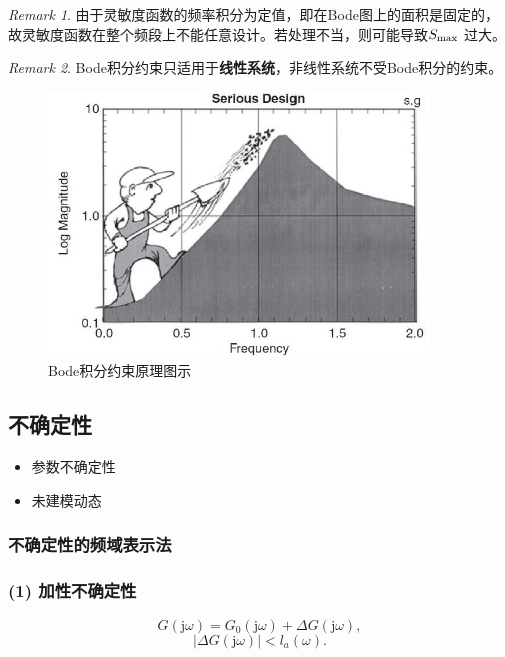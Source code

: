 \documentclass[14pt,a4paper]{article}
\theoremstyle{plain}
\theoremstyle{definition}
\theoremstyle{remark}
\newtheorem{rmk}{Remark}[section]
\theoremstyle{plain}
\theoremstyle{plain}
\theoremstyle{definition}
\begin{document}
			\begin{rmk}  
				由于灵敏度函数的频率积分为定值，即在Bode图上的面积是固定的，故灵敏度函数在整个频段上不能任意设计。若处理不当，则可能导致$S_\textnormal{max}$ 过大。
			\end{rmk} 

			\begin{rmk}  
				Bode积分约束只适用于\textbf{线性系统}，非线性系统不受Bode积分的约束。
			\end{rmk} 

			\begin{figure}[H]
				\centering
				\includegraphics[width=0.9\textwidth]{./figures/bode.jpg} 
				\caption{Bode积分约束原理图示}
				\label{fig:bode}
			\end{figure} 


		\subsection{不确定性}%
		\label{sub:不确定性}
	
			\begin{itemize}
				\item 参数不确定性
				\item 未建模动态
			\end{itemize} 

			\subsubsection{不确定性的频域表示法}%
			\label{ssub:不确定性的频域表示法}
			
				\subsubsection*{(1) 加性不确定性}%
					\[
						G(\mathrm{j} \omega ) = G_0(\mathrm{j} \omega ) + \Delta G(\mathrm{j} \omega )
					,\] 
					\[
						\left| \Delta G(\mathrm{j} \omega ) \right| < l_{a}(\omega )
					.\] 
					
\end{document}
